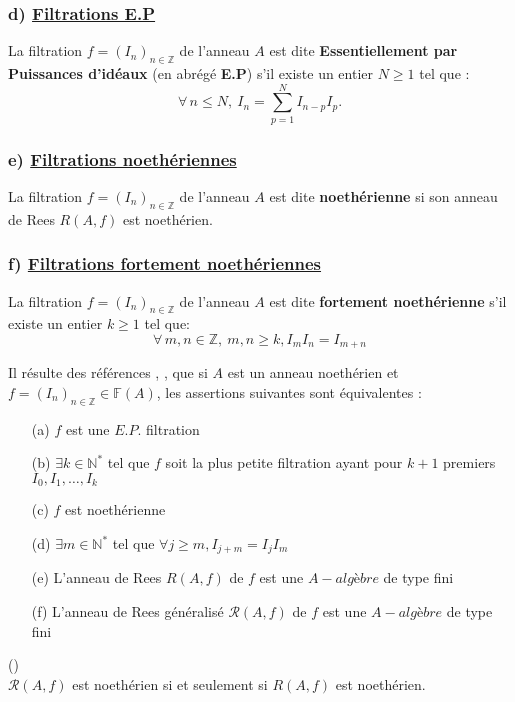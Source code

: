 \subsubsection{d) \underline{Filtrations E.P}}
\begin{madefinition}
	La filtration $f = (I_n)_{n \in \mathbb{Z}}$ de l'anneau $A$ est dite \textbf{Essentiellement par Puissances d'idéaux} (en abrégé \textbf{E.P}) s'il existe un entier $N \geqslant 1$ tel que :
	\[ \forall \, n \leqslant N, \ I_n =\sum_{p=1}^{N} I_{n-p}I_p. \]
\end{madefinition}
\subsubsection{e) \underline{Filtrations noethériennes}}
\begin{madefinition}
	La filtration $f = (I_n)_{n \in \mathbb{Z}}$ de l'anneau $A$ est dite \textbf{noethérienne} si son anneau de Rees ${R}(A,f)$ est noethérien.
\end{madefinition}
\subsubsection{f) \underline{Filtrations fortement noethériennes}}
\begin{madefinition}
	La filtration $f = (I_n)_{n \in \mathbb{Z}}$ de l'anneau $A$ est dite \textbf{fortement noethérienne} s'il existe un entier $k \geqslant 1$ tel que:
	\[ \forall \, m, n \in \mathbb{Z}, \ m, n \geqslant k, I_m I_n = I_{m+n} \]
\end{madefinition}
\begin{maremarque}
	Il résulte des références \cite{4} , \cite{5}, \cite{6} que si $A$ est un anneau noethérien et $f=(I_n)_{n \in \mathbb{Z}} \in \mathbb{F}(A)$, les assertions suivantes sont équivalentes : 
		\begin{enumerate}
				\item[(a)] $f$ est une $E.P.$ filtration
				\item[(b)] $\exists k \in \mathbb{N}^{*}$ tel que $f$ soit la plus petite filtration ayant pour $k+1$ premiers $I_0, I_1,\dots, I_k $
				\item[(c)] $f$ est noethérienne
				\item[(d)] $\exists m \in \mathbb{N}^{*}$ tel que $\forall j \geqslant m, I_{j+m} = I_{j}I_{m}$
				\item[(e)] L'anneau de Rees $R(A,f)$ de $f$ est une $A-algèbre$ de type fini
				\item[(f)] L'anneau de Rees généralisé $\mathcal{R}(A,f)$ de $f$ est une $A-algèbre$ de type fini
		\end{enumerate}
\end{maremarque}
\begin{maremarque}(\cite{2})\\
	$\mathcal{R}(A,f)$ est noethérien si et seulement si $R(A,f)$ est noethérien.
\end{maremarque}

